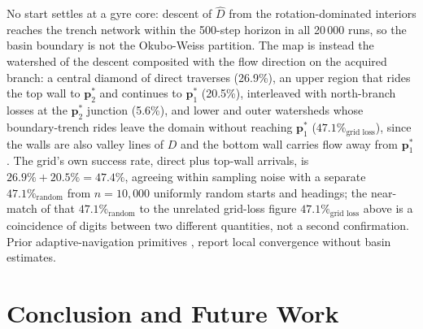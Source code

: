 \documentclass[lettersize,journal]{IEEEtran}
\begin{document}
No start settles at a gyre core: descent of $\hat{D}$ from the
rotation-dominated interiors reaches the trench network within the
500-step horizon in all 20\,000 runs, so the basin boundary is not the
Okubo-Weiss partition. The map is instead the watershed of the descent
composited with the flow direction on the acquired branch: a central
diamond of direct traverses (26.9\%), an upper region that rides the
top wall to $\mathbf{p}^*_2$ and continues to $\mathbf{p}^*_1$
(20.5\%), interleaved with north-branch losses at the $\mathbf{p}^*_2$
junction (5.6\%), and lower and outer watersheds whose boundary-trench
rides leave the domain without reaching $\mathbf{p}^*_1$
($47.1\%_{\text{grid loss}}$), since the walls are also valley lines
of $D$ and the bottom wall carries flow away from $\mathbf{p}^*_1$. The
grid's own success rate, direct plus top-wall arrivals, is
$26.9\% + 20.5\% = 47.4\%$, agreeing within sampling noise with a
separate $47.1\%_{\text{random}}$ from $n = 10{,}000$ uniformly random
starts and headings; the near-match of that
$47.1\%_{\text{random}}$ to the unrelated grid-loss figure
$47.1\%_{\text{grid loss}}$ above is a coincidence of digits between two
different quantities, not a second confirmation. Prior
adaptive-navigation primitives
\cite{27}, \cite{28} report local convergence without basin estimates.

\section{Conclusion and Future Work}
\label{sec:conclusion}
\label{sec:future}
\end{document}
